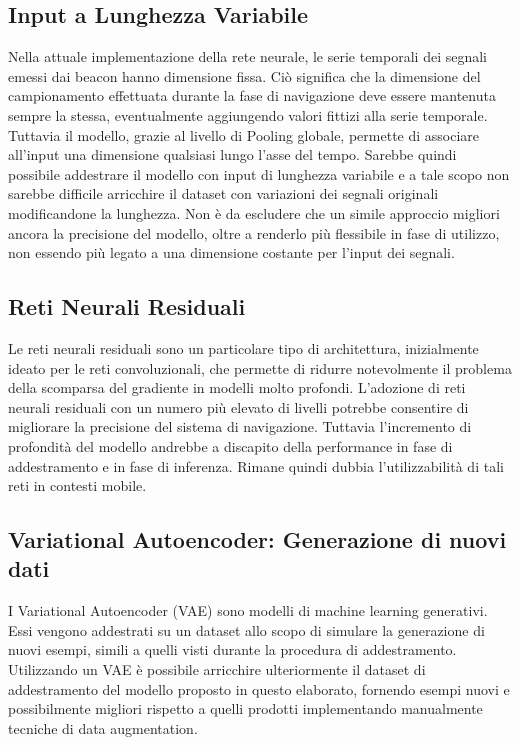 \subsection{Input a Lunghezza Variabile}
Nella attuale implementazione della rete neurale, le serie temporali dei
segnali emessi dai beacon hanno dimensione fissa. Ciò significa che la
dimensione del campionamento effettuata durante la fase di navigazione deve
essere mantenuta sempre la stessa, eventualmente aggiungendo valori fittizi
alla serie temporale. Tuttavia il modello, grazie al livello di Pooling
globale, permette di associare all'input una dimensione qualsiasi lungo l'asse
del tempo. Sarebbe quindi possibile addestrare il modello con input di
lunghezza variabile e a tale scopo non sarebbe difficile arricchire il dataset
con variazioni dei segnali originali modificandone la lunghezza. Non è da
escludere che un simile approccio migliori ancora la precisione del modello,
oltre a renderlo più flessibile in fase di utilizzo, non essendo più legato a
una dimensione costante per l'input dei segnali.
\subsection{Reti Neurali Residuali}
Le reti neurali residuali sono un particolare tipo di architettura,
inizialmente ideato per le reti convoluzionali, che permette di ridurre
notevolmente il problema della scomparsa del gradiente in modelli molto
profondi\cite{resnet}. L'adozione di reti neurali residuali con un numero più
elevato di livelli potrebbe consentire di migliorare la precisione del sistema
di navigazione. Tuttavia l'incremento di profondità del modello andrebbe a
discapito della performance in fase di addestramento e in fase di inferenza.
Rimane quindi dubbia l'utilizzabilità di tali reti in contesti mobile.
\subsection{Variational Autoencoder: Generazione di nuovi dati}
I Variational Autoencoder (VAE) sono modelli di machine learning generativi.
Essi vengono addestrati su un dataset allo scopo di simulare la generazione di
nuovi esempi, simili a quelli visti durante la procedura di
addestramento\cite{vae}.  Utilizzando un VAE è possibile arricchire
ulteriormente il dataset di addestramento del modello proposto in questo
elaborato, fornendo esempi nuovi e possibilmente migliori rispetto a quelli
prodotti implementando manualmente
tecniche di data augmentation.
